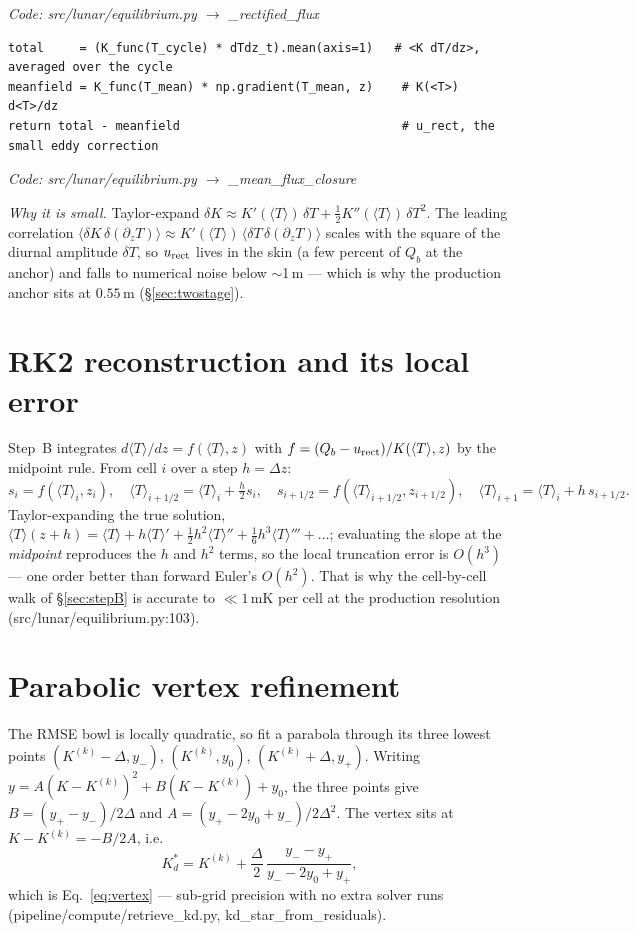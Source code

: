 \documentclass[11pt]{report}
\newcommand{\Tm}{\langle T\rangle}
\newcommand{\code}[1]{{\ttfamily\small #1}}
\begin{document}
{\small\color{dim}\textit{Code: \code{src/lunar/equilibrium.py} $\to$ \code{\_rectified\_flux}}}
\begin{lstlisting}[style=py]
total     = (K_func(T_cycle) * dTdz_t).mean(axis=1)   # <K dT/dz>, averaged over the cycle
meanfield = K_func(T_mean) * np.gradient(T_mean, z)    # K(<T>) d<T>/dz
return total - meanfield                               # u_rect, the small eddy correction
\end{lstlisting}

{\small\color{dim}\textit{Code: \code{src/lunar/equilibrium.py} $\to$ \code{\_mean\_flux\_closure}}}

\emph{Why it is small.} Taylor-expand $\delta K\approx K'(\Tm)\,\delta T
+\tfrac12 K''(\Tm)\,\delta T^2$. The leading correlation
$\langle\delta K\,\delta(\partial_z T)\rangle\approx
K'(\Tm)\,\langle\delta T\,\delta(\partial_z T)\rangle$ scales with the square of
the diurnal amplitude $\delta T$, so $u_{\rm rect}$ lives in the skin (a few
percent of $Q_b$ at the anchor) and falls to numerical noise below $\sim$1\,m ---
which is why the production anchor sits at $0.55$\,m (\S\ref{sec:twostage}).

\section{RK2 reconstruction and its local error}\label{app:rk2}
Step~B integrates $d\Tm/dz=f(\Tm,z)$ with $f=(Q_b-u_{\rm rect})/K(\Tm,z)$ by the
midpoint rule. From cell $i$ over a step $h=\Delta z$:
\[
s_i=f(\Tm_i,z_i),\quad
\Tm_{i+1/2}=\Tm_i+\tfrac{h}{2}s_i,\quad
s_{i+1/2}=f(\Tm_{i+1/2},z_{i+1/2}),\quad
\Tm_{i+1}=\Tm_i+h\,s_{i+1/2}.
\]
Taylor-expanding the true solution, $\Tm(z+h)=\Tm+h\Tm'+\tfrac12h^2\Tm''
+\tfrac16h^3\Tm'''+\dots$; evaluating the slope at the \emph{midpoint} reproduces
the $h$ and $h^2$ terms, so the local truncation error is $O(h^3)$ --- one order
better than forward Euler's $O(h^2)$. That is why the cell-by-cell walk of
\S\ref{sec:stepB} is accurate to $\ll1$\,mK per cell at the production resolution
(\code{src/lunar/equilibrium.py:103}).

\section{Parabolic vertex refinement}\label{app:vertex}
The RMSE bowl is locally quadratic, so fit a parabola through its three lowest
points $(K^{(k)}{-}\Delta,y_-)$, $(K^{(k)},y_0)$, $(K^{(k)}{+}\Delta,y_+)$. Writing
$y=A(K-K^{(k)})^2+B(K-K^{(k)})+y_0$, the three points give
$B=(y_+-y_-)/2\Delta$ and $A=(y_+-2y_0+y_-)/2\Delta^2$. The vertex sits at
$K-K^{(k)}=-B/2A$, i.e.
\[
\boxed{\;K_d^{*}=K^{(k)}+\frac{\Delta}{2}\,\frac{y_--y_+}{y_--2y_0+y_+},\;}
\]
which is Eq.~\eqref{eq:vertex} --- sub-grid precision with no extra solver runs
(\code{pipeline/compute/retrieve\_kd.py}, \code{kd\_star\_from\_residuals}).
\end{document}
